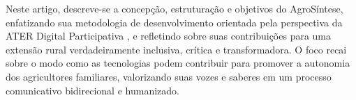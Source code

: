 \begin{flushleft}
	Neste artigo, descreve-se a concepção, estruturação e objetivos do AgroSíntese, enfatizando sua metodologia de desenvolvimento orientada pela perspectiva da ATER Digital Participativa \cite{parra2022ater}, e refletindo sobre suas contribuições para uma extensão rural verdadeiramente inclusiva, crítica e transformadora. O foco recai sobre o modo como as tecnologias podem contribuir para promover a autonomia dos agricultores familiares, valorizando suas vozes e saberes em um processo comunicativo bidirecional e humanizado.
	
	
	
	
\end{flushleft}


